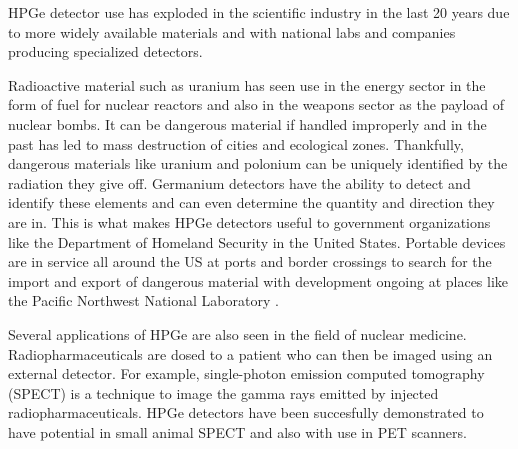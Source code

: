 HPGe detector use has exploded in the scientific industry in the last 20 years due to more widely available materials and with national labs and companies producing specialized detectors.

Radioactive material such as uranium has seen use in the energy sector in the form of fuel for nuclear reactors and also in the weapons sector as the payload of nuclear bombs.
It can be dangerous material if handled improperly and in the past has led to mass destruction of cities and ecological zones.
Thankfully, dangerous materials like uranium and polonium can be uniquely identified by the radiation they give off.
Germanium detectors have the ability to detect and identify these elements and can even determine the quantity and direction they are in.
This is what makes HPGe detectors useful to government organizations like the Department of Homeland Security in the United States.
Portable devices are in service all around the US at ports and border crossings to search for the import and export of dangerous material with development ongoing at places like the Pacific Northwest National Laboratory \cite{StaveHS}.

Several applications of HPGe are also seen in the field of nuclear medicine.
Radiopharmaceuticals are dosed to a patient who can then be imaged using an external detector.
For example, single-photon emission computed tomography (SPECT) is a technique to image the gamma rays emitted by injected radiopharmaceuticals.
HPGe detectors have been succesfully demonstrated to have potential in small animal SPECT \cite{SPECT} and also with use in PET scanners.

